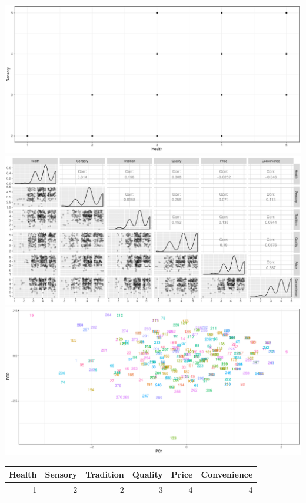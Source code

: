 \documentclass[]{article}
\begin{document}
\includegraphics{Consumer-attitude-towards-fish-sauce-products_files/figure-latex/unnamed-chunk-13-1.pdf}
\includegraphics{Consumer-attitude-towards-fish-sauce-products_files/figure-latex/unnamed-chunk-13-2.pdf}
\includegraphics{Consumer-attitude-towards-fish-sauce-products_files/figure-latex/unnamed-chunk-13-3.pdf}

\begin{tabular}{rrrrrr}
\toprule
\textbf{Health} & \textbf{Sensory} & \textbf{Tradition} & \textbf{Quality} & \textbf{Price} & \textbf{Convenience}\\
\midrule
1 & 2 & 2 & 3 & 4 & 4\\
\bottomrule
\end{tabular}
\end{document}
